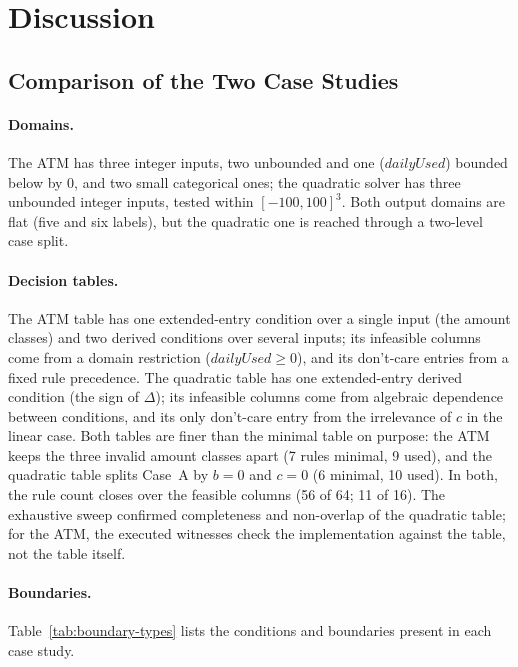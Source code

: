 \documentclass[11pt,a4paper]{article}
\begin{document}
\section{Discussion}
\label{sec:discussion}

\subsection{Comparison of the Two Case Studies}
\label{sec:cross-case}

\paragraph{Domains.} The ATM has three integer inputs, two unbounded and one (\(\mathit{dailyUsed}\)) bounded below by \(0\), and two small categorical ones; the quadratic solver has three unbounded integer
inputs, tested within \([-100,100]^3\). Both output domains are flat (five
and six labels), but the quadratic one is reached through a two-level case
split.

\paragraph{Decision tables.} The ATM table has one extended-entry condition
over a single input (the amount classes) and two derived conditions over
several inputs; its infeasible columns come from a domain restriction
(\(\mathit{dailyUsed}\ge0\)), and its don't-care entries from a fixed rule
precedence. The quadratic table has one extended-entry derived condition
(the sign of \(\Delta\)); its infeasible columns come from algebraic
dependence between conditions, and its only don't-care entry from the
irrelevance of \(c\) in the linear case. Both tables are finer than the
minimal table on purpose: the ATM keeps the three invalid amount classes
apart (7 rules minimal, 9 used), and the quadratic table splits Case~A by
\(b=0\) and \(c=0\) (6 minimal, 10 used). In both, the rule count closes over
the feasible columns (56 of 64; 11 of 16). The exhaustive sweep confirmed completeness and non-overlap of the quadratic table; for the ATM, the executed witnesses check the implementation against the table, not the table itself.

\paragraph{Boundaries.} Table~\ref{tab:boundary-types} lists the conditions
and boundaries present in each case study.
\end{document}

